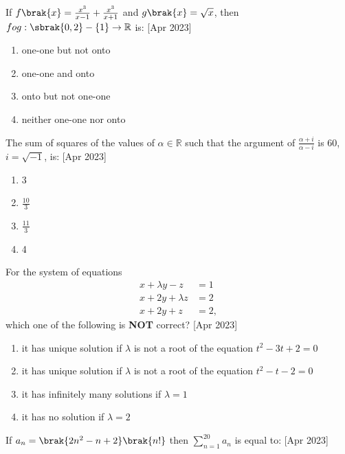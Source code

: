 \iffalse
\title{2023}
\author{AI24BTECH11009}
\section{mcq-single}
\fi
\item If $f\brak{x} = \frac{x^3}{x-1} + \frac{x^3}{x+1}$ and $g\brak{x} = \sqrt{x}$, then $fog: \sbrak{0, 2}-\{1\}\rightarrow\mathbb{R}$ is: \hfill[Apr 2023]
    \begin{enumerate}
        \item one-one but not onto
        \item one-one and onto
        \item onto but not one-one
        \item neither one-one nor onto \\
    \end{enumerate}
\item The sum of squares of the values of $\alpha\in\mathbb{R}$ such that the argument of $\frac{\alpha+i}{\alpha-i}$ is 60\degree, $i=\sqrt{-1}$, is: \hfill[Apr 2023]
\begin{enumerate}
    \item 3
    \item $\frac{10}{3}$
    \item $\frac{11}{3}$
    \item 4 \\
\end{enumerate}
\item For the system of equations
\begin{align*}
    x + \lambda y - z & = 1 \\
    x + 2y + \lambda z & = 2 \\
    x + 2y + z & = 2,
\end{align*}
which one of the following is \textbf{NOT} correct? \hfill[Apr 2023]
\begin{enumerate}
    \item it has unique solution if $\lambda$ is not a root of the equation $t^2 - 3t + 2 = 0$
    \item it has unique solution if $\lambda$ is not a root of the equation $t^2 - t - 2 = 0$
    \item it has infinitely many solutions if $\lambda = 1$
    \item it has no solution if $\lambda = 2$ \\
\end{enumerate}
 \item If $a_n = \brak{2n^2 - n + 2}\brak{n!}$ then $\sum\limits_{n=1}^{20}a_n$ is equal to: \hfill[Apr 2023]
